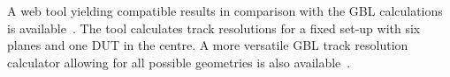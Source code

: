 A web tool yielding compatible results in comparison with the GBL calculations is available~\cite{webtool}. 
The tool calculates track resolutions for a fixed set-up with six planes and one DUT in the centre. 
A more versatile GBL track resolution calculator allowing for all possible geometries is also available~\cite{gbltool}. 
